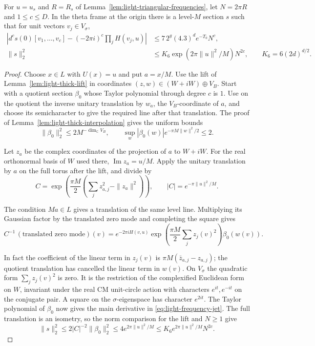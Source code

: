 \begin{auxlemma}
\label{lem:light-frequency-column}
For \(u=u_s\) and \(R=R_s\) of
Lemma~\ref{lem:light-triangular-frequencies}, let \(N=2\pi R\)
and \(1\le c\le D\). In the theta frame at the origin there is a
level-\(M\) section \(s\) such that for unit vectors
\(v_j\in V_\sigma\),
\begin{align}
 \left|d^cs(0)[v_1,\ldots,v_c]
      -(-2\pi i)^c\prod_j H(v_j,u)\right|
      &\le 7\,2^g(4.3)^d e^{-T_0}N^c,
       \label{eq:light-frequency-jet}\\
 \|s\|_2^2 &\le K_6\exp(2\pi\|u\|^2/M)N^{2c},
 \qquad K_6=6(2d)^{d/2}.\nonumber
\end{align}
\end{auxlemma}
\begin{proof}
Choose \(x\in L\) with \(U(x)=u\) and put \(a=x/M\).
Use the lift of Lemma~\ref{lem:light-thick-lift} in coordinates
\((z,w)\in(W+iW)\oplus V_B\). Start with a quotient section
\(\beta_0\) whose Taylor polynomial through degree \(c\) is
\(1\). Use on the quotient the inverse unitary translation by
\(w_a\), the \(V_B\)-coordinate of \(a\), and choose its
semicharacter to give the required line after that translation.
The proof of Lemma~\ref{lem:light-thick-interpolation}
gives the uniform bounds
\[
 \|\beta_0\|_2^2\le 2M^{-\dim_{\mathbb C}V_B},\qquad
 \sup_w |\beta_0(w)|e^{-\pi M\|w\|^2/2}\le2 .
\]

Let \(z_a\) be the complex coordinates of the projection of
\(a\) to \(W+iW\). For the real orthonormal basis of \(W\) used
there, \(\operatorname{Im}z_a=u/M\). Apply the unitary translation
by \(a\) on the full torus after the lift, and divide by
\[
 C=\exp\!\left(\frac{\pi M}{2}
                 \left(\sum_j z_{a,j}^2-\|z_a\|^2\right)\right),
 \qquad |C|=e^{-\pi\|u\|^2/M}.
\]

The condition \(Ma\in L\) gives a translation of the same level
line. Multiplying its Gaussian factor by the translated zero mode
and completing the square gives
\[
   C^{-1}\,(\text{translated zero mode})(v)
    =e^{-2\pi i H(v,u)}
       \exp\!\left(\frac{\pi M}{2}\sum_j z_j(v)^2\right)
       \beta_0(w(v)).
\]

In fact the coefficient of the linear term in \(z_j(v)\) is
\(\pi M(\bar z_{a,j}-z_{a,j})\); the quotient translation has
cancelled the linear term in \(w(v)\). On \(V_\sigma\) the
quadratic form \(\sum_j z_j(v)^2\) is zero. It is the restriction
of the complexified Euclidean form on \(W\), invariant under the
real CM unit-circle action with characters \(e^{it},e^{-it}\)
on the conjugate pair. A square on the \(\sigma\)-eigenspace
has character \(e^{2it}\). The Taylor polynomial of \(\beta_0\)
now gives the main derivative in \eqref{eq:light-frequency-jet}.
The full translation is an isometry, so the norm comparison for the
lift and \(N\ge1\) give
\[
 \|s\|_2^2\le2|C|^{-2}\|\beta_0\|_2^2
             \le4e^{2\pi\|u\|^2/M}\le K_6e^{2\pi\|u\|^2/M}N^{2c}.
\]


\end{proof}
